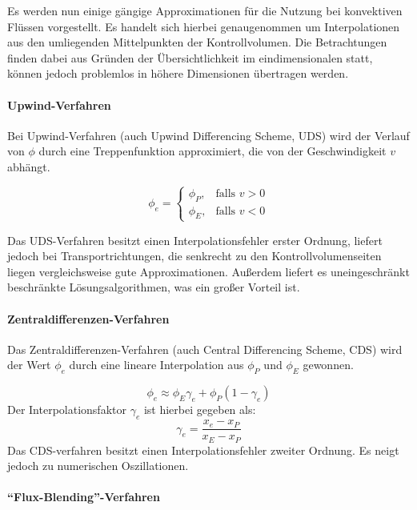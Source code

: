 Es werden nun einige gängige Approximationen für die Nutzung bei konvektiven Flüssen vorgestellt.
Es handelt sich hierbei genaugenommen um Interpolationen aus den umliegenden Mittelpunkten der Kontrollvolumen.
Die Betrachtungen finden dabei aus Gründen der Übersichtlichkeit im eindimensionalen statt,
können jedoch problemlos in höhere Dimensionen übertragen werden.

\paragraph{Upwind-Verfahren}
Bei Upwind-Verfahren (auch Upwind Differencing Scheme, UDS) wird der Verlauf von $\phi$ durch eine Treppenfunktion approximiert, die
von der Geschwindigkeit $v$ abhängt.

\begin{equation*}
\phi_e=\left\{\begin{array}{cl} \phi_P, & \mbox{falls }v>0\\
\phi_E, & \mbox{falls } v<0\end{array}\right.
\end{equation*}

Das UDS-Verfahren besitzt einen Interpolationsfehler erster Ordnung, liefert jedoch bei
Transportrichtungen, die senkrecht zu den Kontrollvolumenseiten liegen vergleichsweise gute Approximationen.
Außerdem liefert es uneingeschränkt beschränkte Lösungsalgorithmen, was ein großer Vorteil ist.




\paragraph{Zentraldifferenzen-Verfahren}
Das Zentraldifferenzen-Verfahren (auch Central Differencing Scheme, CDS) wird der
Wert $\phi_e$ durch eine lineare Interpolation aus $\phi_P$ und $\phi_E$ gewonnen.

\begin{equation*}
  \phi_e \approx \phi_E\gamma_e + \phi_P (1-\gamma_e)
\end{equation*}
Der Interpolationsfaktor $\gamma_e$ ist hierbei gegeben als:
\begin{equation}
  \gamma_e = \frac{x_e-x_P}{x_E-x_P}
  \label{eq:cds_faktor}
\end{equation}
Das CDS-verfahren besitzt einen Interpolationsfehler zweiter Ordnung. Es neigt jedoch zu
numerischen Oszillationen.

\paragraph{``Flux-Blending''-Verfahren}

